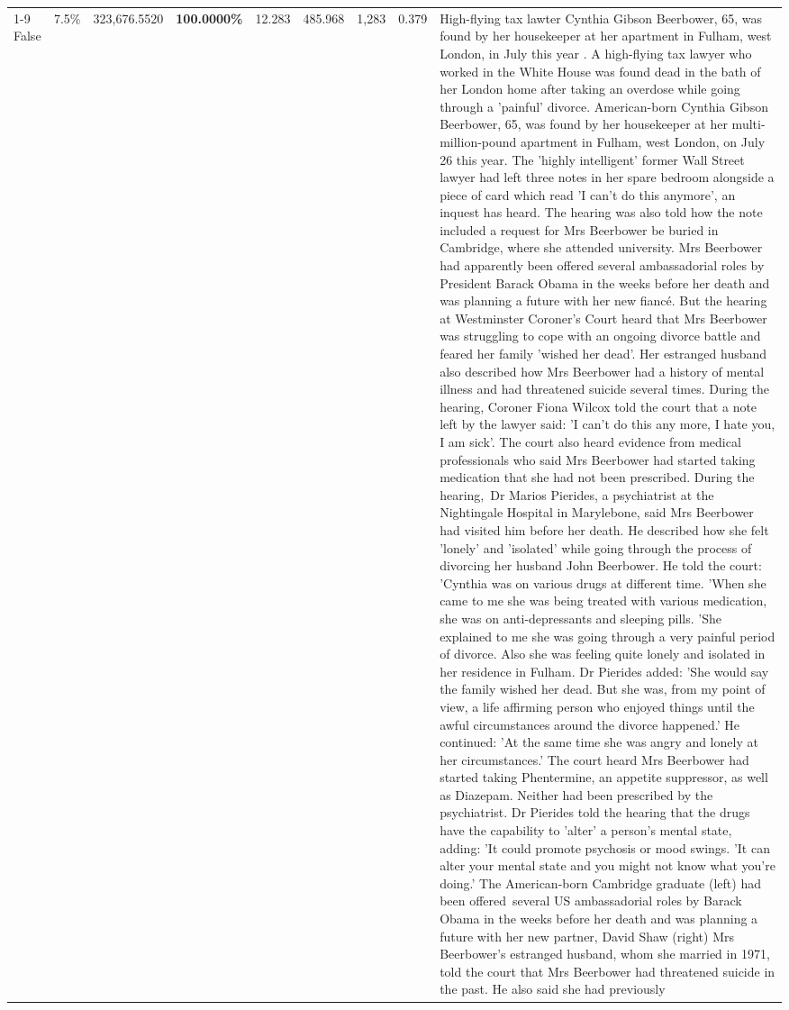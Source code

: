 \begin{table}[H]
\begin{tabular}{lllrlllll}
\cline{1-9}
False & 7.5\% & 323,676.5520 & \bfseries \color{red} 100.0000\% & 12.283 & 485.968 & 1,283 & 0.379 & High-flying tax lawter Cynthia Gibson Beerbower, 65, was found by her housekeeper at her apartment in Fulham, west London, in July this year . A high-flying tax lawyer who worked in the White House was found dead in the bath of her London home after taking an overdose while going through a 'painful' divorce. American-born Cynthia Gibson Beerbower, 65, was found by her housekeeper at her multi-million-pound apartment in Fulham, west London, on July 26 this year. The 'highly intelligent' former Wall Street lawyer had left three notes in her spare bedroom alongside a piece of card which read 'I can't do this anymore', an inquest has heard. The hearing was also told how the note included a request for Mrs Beerbower be buried in Cambridge, where she attended university. Mrs Beerbower had apparently been offered several ambassadorial roles by President Barack Obama in the weeks before her death and was planning a future with her new fiancé. But the hearing at Westminster Coroner's Court heard that Mrs Beerbower was struggling to cope with an ongoing divorce battle and feared her family 'wished her dead'. Her estranged husband also described how Mrs Beerbower had a history of mental illness and had threatened suicide several times. During the hearing, Coroner Fiona Wilcox told the court that a note left by the lawyer said: 'I can't do this any more, I hate you, I am sick'. The court also heard evidence from medical professionals who said Mrs Beerbower had started taking medication that she had not been prescribed. During the hearing, Dr Marios Pierides, a psychiatrist at the Nightingale Hospital in Marylebone, said Mrs Beerbower had visited him before her death. He described how she felt 'lonely' and 'isolated' while going through the process of divorcing her husband John Beerbower. He told the court: 'Cynthia was on various drugs at different time. 'When she came to me she was being treated with various medication, she was on anti-depressants and sleeping pills. 'She explained to me she was going through a very painful period of divorce. Also she was feeling quite lonely and isolated in her residence in Fulham. Dr Pierides added: 'She would say the family wished her dead. But she was, from my point of view, a life affirming person who enjoyed things until the awful circumstances around the divorce happened.' He continued: 'At the same time she was angry and lonely at her circumstances.' The court heard Mrs Beerbower had started taking Phentermine, an appetite suppressor, as well as Diazepam. Neither had been prescribed by the psychiatrist. Dr Pierides told the hearing that the drugs have the capability to 'alter' a person's mental state, adding: 'It could promote psychosis or mood swings. 'It can alter your mental state and you might not know what you're doing.' The American-born Cambridge graduate (left) had been offered several US ambassadorial roles by Barack Obama in the weeks before her death and was planning a future with her new partner, David Shaw (right) Mrs Beerbower's estranged husband, whom she married in 1971, told the court that Mrs Beerbower had threatened suicide in the past. He also said she had previously 
\end{tabular}
\end{table}
